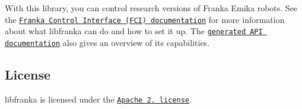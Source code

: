 \href{https://travis-ci.org/frankaemika/libfranka}{\tt } \href{https://codecov.io/gh/frankaemika/libfranka}{\tt }

With this library, you can control research versions of Franka Emika robots. See the \href{https://frankaemika.github.io/docs}{\tt Franka Control Interface (F\+CI) documentation} for more information about what {\ttfamily libfranka} can do and how to set it up. The \href{https://frankaemika.github.io/libfranka}{\tt generated A\+PI documentation} also gives an overview of its capabilities.

\subsection*{License}

{\ttfamily libfranka} is licensed under the \href{https://www.apache.org/licenses/LICENSE-2.0.html}{\tt Apache 2. license}. 